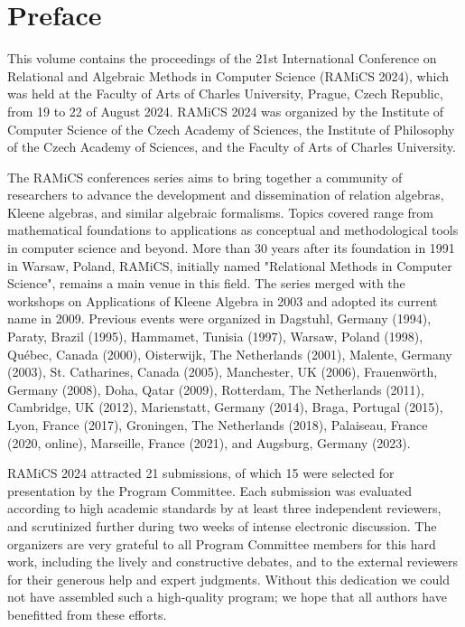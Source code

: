 \documentclass{llncs}
\begin{document}
\section*{Preface}
This volume contains the proceedings of the 21st International
Conference on Relational and Algebraic Methods in Computer Science
(RAMiCS 2024), which was held at the Faculty of Arts of Charles University, 
Prague, Czech Republic, from 19 to 22 of August 2024. RAMiCS 2024 was organized by the Institute of Computer Science of the Czech Academy of Sciences, the Institute of Philosophy of the Czech Academy of Sciences, and the Faculty of Arts of Charles University.

The RAMiCS conferences series aims to bring together a community of
researchers to advance the development and dissemination of relation
algebras, Kleene algebras, and similar algebraic formalisms. Topics
covered range from mathematical foundations to applications as
conceptual and methodological tools in computer science and
beyond. More than 30 years after its foundation in 1991 in Warsaw,
Poland, RAMiCS, initially named "Relational Methods in Computer
Science", remains a main venue in this field. The series merged with
the workshops on Applications of Kleene Algebra in 2003 and adopted
its current name in 2009. Previous events were organized in Dagstuhl,
Germany (1994), Paraty, Brazil (1995), Hammamet, Tunisia (1997),
Warsaw, Poland (1998), Qu\'ebec, Canada (2000), Oisterwijk, The
Netherlands (2001), Malente, Germany (2003), St. Catharines, Canada
(2005), Manchester, UK (2006), Frauenw\"orth, Germany (2008), Doha,
Qatar (2009), Rotterdam, The Netherlands (2011), Cambridge, UK (2012),
Marienstatt, Germany (2014), Braga, Portugal (2015), Lyon, France
(2017), Groningen, The Netherlands (2018), Palaiseau, France (2020,
online), Marseille, France (2021), and Augsburg, Germany (2023).

RAMiCS 2024 attracted 21 submissions, of which 15 were
selected for presentation by the Program Committee. Each submission
was evaluated according to high academic standards by at least three
independent reviewers, and scrutinized further during two weeks of
intense electronic discussion. The organizers are very grateful to all
Program Committee members for this hard work, including the lively and
constructive debates, and to the external reviewers for their generous
help and expert judgments. Without this dedication we could not have
assembled such a high-quality program; we hope that all authors have
benefitted from these efforts.
\end{document}
